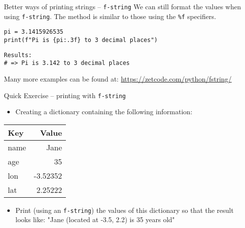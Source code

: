 \documentclass[10pt]{beamer}
\begin{document}
\begin{frame}[label={sec:org3469f16},fragile]{Better ways of printing strings -- \texttt{f-string}}
 We can still format the values when using \texttt{f-string}. The method is similar to those
using the \texttt{\%f} specifiers.

\begin{verbatim}
pi = 3.1415926535
print(f"Pi is {pi:.3f} to 3 decimal places")
\end{verbatim}

\begin{verbatim}
Results: 
# => Pi is 3.142 to 3 decimal places
\end{verbatim}


Many more examples can be found at: \url{https://zetcode.com/python/fstring/}
\end{frame}

\begin{frame}[label={sec:orgd1df163},fragile]{Quick Exercise -- printing with \texttt{f-string}}
 \begin{itemize}
\item Creating a dictionary containing the following information:
\end{itemize}

\begin{center}
\begin{tabular}{lr}
Key & Value\\
\hline
name & Jane\\
age & 35\\
lon & -3.52352\\
lat & 2.25222\\
\end{tabular}
\end{center}

\begin{itemize}
\item Print (using an \texttt{f-string}) the values of this dictionary so that the result looks
like: "Jane (located at -3.5, 2.2) is 35 years old"
\end{itemize}
\end{frame}
\end{document}
